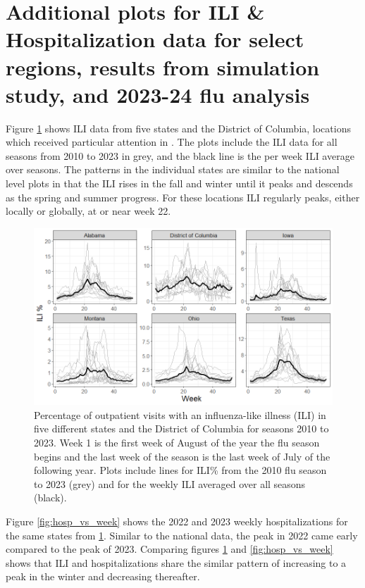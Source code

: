 \documentclass{article}
\begin{document}
\renewcommand{\thesection}{\Alph{section}}

\section{Additional plots for ILI \& Hospitalization data for select regions,
         results from simulation study, and 2023-24 flu analysis}

Figure \ref{fig:ili_vs_week} shows ILI data from five states and the District of Columbia, locations which received particular attention in \cite{osthus2021multiscale}. The plots include the ILI data for all seasons from 2010 to 2023 in grey, and the black line is the per week ILI average over seasons. The patterns in the individual states are similar to the national level plots in that the ILI rises in the fall and winter until it peaks and descends as the spring and summer progress. For these locations ILI regularly peaks, either locally or globally, at or near week 22. 

 \begin{figure}[hbt!]
    \centering
    \includegraphics[scale=.5]{Images/ili_vs_week.png}
    \caption{Percentage of outpatient visits with an influenza-like illness (ILI) in five different states and the District of Columbia for seasons 2010 to 2023. Week 1 is the first week of August of the year the flu season begins and the last week of the season is the last week of July of the following year.
     Plots include lines for ILI\% from the 2010 flu season to 2023 (grey) and for the weekly ILI averaged over all seasons (black).}
    \label{fig:ili_vs_week}
\end{figure}


Figure \ref{fig:hosp_vs_week} shows the 2022 and 2023 weekly hospitalizations for the same states from \ref{fig:ili_vs_week}. Similar to the national data, the peak in 2022 came early compared to the peak of 2023. Comparing figures \ref{fig:ili_vs_week} and \ref{fig:hosp_vs_week} shows that ILI and hospitalizations share the similar pattern of increasing to a peak in the winter and decreasing thereafter. 
\end{document}
